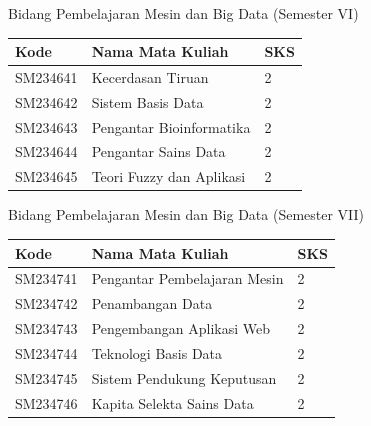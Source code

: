 \documentclass[aspectratio=169]{beamer} %
\begin{document}

\begin{frame}{Bidang Pembelajaran Mesin dan Big Data (Semester VI)}

\begin{table}
	\renewcommand{\arraystretch}{1.3}
	\setlength{\tabcolsep}{10pt}
	\begin{tabular}{l l l}
		\toprule
		\textbf{Kode} & \textbf{Nama Mata Kuliah} & \textbf{SKS} \\
		\midrule
		SM234641 & Kecerdasan Tiruan & 2 \\
		SM234642 & Sistem Basis Data & 2 \\
		SM234643 & Pengantar Bioinformatika & 2 \\
		SM234644 & Pengantar Sains Data & 2 \\
		SM234645 & Teori Fuzzy dan  Aplikasi & 2 \\
		\bottomrule
	\end{tabular}
\end{table}

\end{frame}

\begin{frame}{Bidang Pembelajaran Mesin dan Big Data (Semester VII)}

\begin{table}
	\renewcommand{\arraystretch}{1.3}
	\setlength{\tabcolsep}{10pt}
	\begin{tabular}{l l l}
		\toprule
		\textbf{Kode} & \textbf{Nama Mata Kuliah} & \textbf{SKS} \\
		\midrule
		SM234741 & Pengantar Pembelajaran Mesin & 2 \\
		SM234742 & Penambangan Data & 2 \\
		SM234743 & Pengembangan Aplikasi Web & 2 \\
		SM234744 & Teknologi Basis Data & 2 \\
		SM234745 & Sistem Pendukung Keputusan & 2 \\
		SM234746 & Kapita Selekta Sains Data & 2 \\
		\bottomrule
	\end{tabular}
\end{table}

\end{frame}

\end{document}
